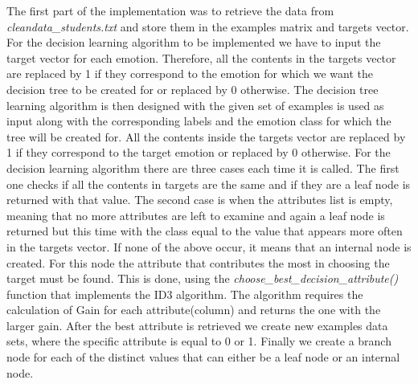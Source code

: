 The first part of the implementation was to retrieve the data from
\emph{cleandata\_students.txt} and store them in the examples matrix and targets
vector. For the decision learning algorithm to be implemented we have to input
the target vector for each emotion. Therefore, all the contents in the targets
vector are replaced by 1 if they correspond to the emotion for which we
want the decision tree to be created for or replaced by 0 otherwise. The decision
tree learning algorithm is then designed with the given set of examples is used
as input along with the corresponding labels and the emotion class for which
the tree will be created for.  All the contents inside the targets vector are
replaced by 1 if they correspond to the target emotion or replaced by 0
otherwise. For the decision learning algorithm there are three cases each time
it is called. The first one checks if all the contents in targets are the same
and if they are a leaf node is returned with that value. The second case is
when the attributes list is empty, meaning that no more attributes are left to
examine and again a leaf node is returned but this time with the class equal to
the value that appears more often in the targets vector. If none of the above
occur, it means that an internal node is created. For this node the attribute
that contributes the most in choosing the target must be found. This is done,
using the \emph{choose\_best\_decision\_attribute()} function that implements the ID3 algorithm. The algorithm requires the calculation of Gain for each attribute(column) and returns the one with the larger gain. After the best attribute is retrieved we create new examples data sets, where the specific attribute is equal to 0 or 1. Finally we create a branch node for each of the distinct values that can either be a leaf node or an internal node.
